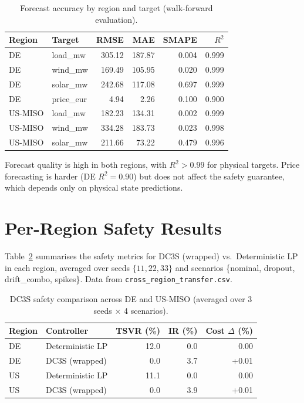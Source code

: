 \begin{table}[ht]
\centering
\caption{Forecast accuracy by region and target (walk-forward evaluation).}
\label{tab:region-forecast}
\begin{tabular}{llrrrr}
\toprule
\textbf{Region} & \textbf{Target} & \textbf{RMSE} & \textbf{MAE} &
  \textbf{SMAPE} & \textbf{$R^2$} \\
\midrule
DE      & load\_mw    & 305.12 & 187.87 & 0.004 & 0.999 \\
DE      & wind\_mw    & 169.49 & 105.95 & 0.020 & 0.999 \\
DE      & solar\_mw   & 242.68 & 117.08 & 0.697 & 0.999 \\
DE      & price\_eur  &   4.94 &   2.26 & 0.100 & 0.900 \\
\midrule
US-MISO & load\_mw    & 182.23 & 134.31 & 0.002 & 0.999 \\
US-MISO & wind\_mw    & 334.28 & 183.73 & 0.023 & 0.998 \\
US-MISO & solar\_mw   & 211.66 &  73.22 & 0.479 & 0.996 \\
\bottomrule
\end{tabular}
\end{table}

Forecast quality is high in both regions, with $R^2 > 0.99$ for
physical targets.  Price forecasting is harder (DE $R^2 = 0.90$) but
does not affect the safety guarantee, which depends only on physical
state predictions.

\section{Per-Region Safety Results}

Table~\ref{tab:region-safety} summarises the safety metrics for
DC3S (wrapped) vs.\ Deterministic LP in each region, averaged over
seeds $\{11, 22, 33\}$ and scenarios \{nominal, dropout, drift\_combo,
spikes\}.  Data from \texttt{cross\_region\_transfer.csv}.

\begin{table}[ht]
\centering
\caption{DC3S safety comparison across DE and US-MISO
  (averaged over 3 seeds $\times$ 4 scenarios).}
\label{tab:region-safety}
\begin{tabular}{llrrr}
\toprule
\textbf{Region} & \textbf{Controller} & \textbf{TSVR (\%)} &
  \textbf{IR (\%)} & \textbf{Cost $\Delta$ (\%)} \\
\midrule
DE & Deterministic LP & 12.0 & 0.0 &  0.00 \\
DE & DC3S (wrapped)   &  0.0 & 3.7 & +0.01 \\
\midrule
US & Deterministic LP & 11.1 & 0.0 &  0.00 \\
US & DC3S (wrapped)   &  0.0 & 3.9 & +0.01 \\
\bottomrule
\end{tabular}
\end{table}

